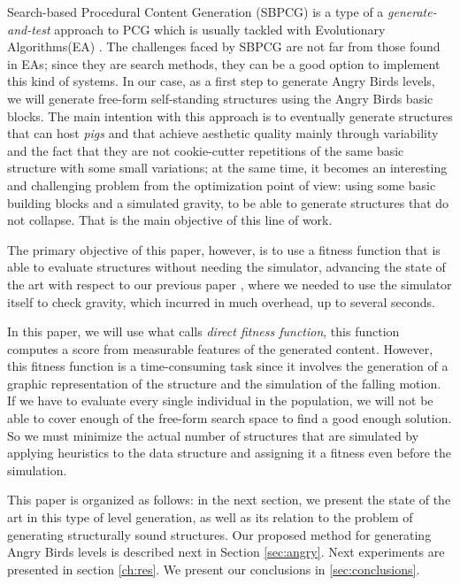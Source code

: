 \documentclass[a4paper,twoside]{article}
\begin{document}
Search-based Procedural Content Generation (SBPCG) is a type of a
\textit{generate-and-test} approach to PCG which is usually tackled
with Evolutionary Algorithms(EA) \cite{togelius2010search}. The
challenges faced by SBPCG are not far from those found in EAs; since
they are search methods, they can be a good option to implement this
kind of systems. In our case, as a first step to generate Angry Birds
levels, we will generate free-form self-standing structures using the Angry
Birds basic blocks. The main intention with this approach is to
eventually generate structures that can host {\em pigs} and that
achieve aesthetic quality mainly through variability and the fact that
they are not cookie-cutter repetitions of the same basic structure
with some small variations; at the same time,
it becomes an interesting and challenging problem from the
optimization point of view: using some basic building blocks and a
simulated gravity, to be able to generate structures that do not
collapse. That is the main objective of this line of work.

The primary objective of this paper, however, is to use a fitness function that is
able to evaluate structures without needing the simulator, advancing
the state of the art with respect to our previous paper
\cite{DBLP:conf/evoW/CalleGGV19}, where we needed to use the simulator
itself to check gravity, which incurred in much overhead, up to
several seconds.

In this paper, we will use what \cite{togelius2010search} calls {\em
  direct fitness function}, this function computes a score from
measurable features of the generated content. However, this fitness
function is a time-consuming task since it involves the generation of
a graphic representation of the structure and the simulation of the
falling motion. If we have to evaluate every single individual in the
population, we will not be able to cover enough of the free-form
search space to find a good enough solution. So we must minimize the
actual number of structures that are simulated by applying heuristics
to the data structure and assigning it a fitness even before the
simulation. 


This paper is organized as follows: in the next section, we present
the state of the art in this type of level generation, as well as its
relation to the problem of generating structurally sound
structures. Our proposed method for generating Angry Birds levels is
described next in Section \ref{sec:angry}. Next experiments are
presented in section \ref{ch:res}. We present our conclusions in
\ref{sec:conclusions}.
\end{document}
